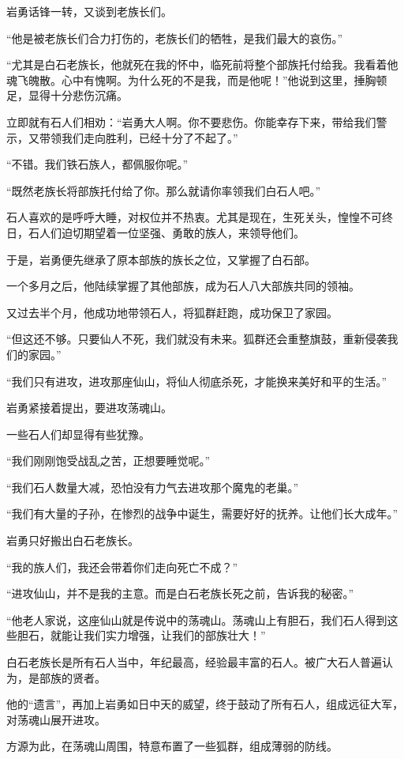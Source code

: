 \begin{this_body}
岩勇话锋一转，又谈到老族长们。

“他是被老族长们合力打伤的，老族长们的牺牲，是我们最大的哀伤。”

“尤其是白石老族长，他就死在我的怀中，临死前将整个部族托付给我。我看着他魂飞魄散。心中有愧啊。为什么死的不是我，而是他呢！”他说到这里，捶胸顿足，显得十分悲伤沉痛。

立即就有石人们相劝：“岩勇大人啊。你不要悲伤。你能幸存下来，带给我们警示，又带领我们走向胜利，已经十分了不起了。”

“不错。我们铁石族人，都佩服你呢。”

“既然老族长将部族托付给了你。那么就请你率领我们白石人吧。”

石人喜欢的是呼呼大睡，对权位并不热衷。尤其是现在，生死关头，惶惶不可终日，石人们迫切期望着一位坚强、勇敢的族人，来领导他们。

于是，岩勇便先继承了原本部族的族长之位，又掌握了白石部。

一个多月之后，他陆续掌握了其他部族，成为石人八大部族共同的领袖。

又过去半个月，他成功地带领石人，将狐群赶跑，成功保卫了家园。

“但这还不够。只要仙人不死，我们就没有未来。狐群还会重整旗鼓，重新侵袭我们的家园。”

“我们只有进攻，进攻那座仙山，将仙人彻底杀死，才能换来美好和平的生活。”

岩勇紧接着提出，要进攻荡魂山。

一些石人们却显得有些犹豫。

“我们刚刚饱受战乱之苦，正想要睡觉呢。”

“我们石人数量大减，恐怕没有力气去进攻那个魔鬼的老巢。”

“我们有大量的子孙，在惨烈的战争中诞生，需要好好的抚养。让他们长大成年。”

岩勇只好搬出白石老族长。

“我的族人们，我还会带着你们走向死亡不成？”

“进攻仙山，并不是我的主意。而是白石老族长死之前，告诉我的秘密。”

“他老人家说，这座仙山就是传说中的荡魂山。荡魂山上有胆石，我们石人得到这些胆石，就能让我们实力增强，让我们的部族壮大！”

白石老族长是所有石人当中，年纪最高，经验最丰富的石人。被广大石人普遍认为，是部族的贤者。

他的“遗言”，再加上岩勇如日中天的威望，终于鼓动了所有石人，组成远征大军，对荡魂山展开进攻。

方源为此，在荡魂山周围，特意布置了一些狐群，组成薄弱的防线。


\end{this_body}
